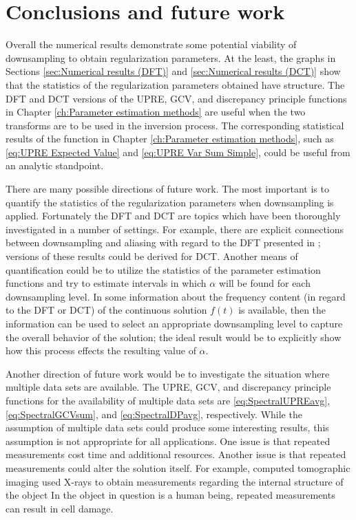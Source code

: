 \documentclass[12pt,notitlepage]{report}
\newcommand{\regparam}{\alpha}
\begin{document}
\chapter{Conclusions and future work} \label{ch:Conclusion}
Overall the numerical results demonstrate some potential viability of downsampling to obtain regularization parameters. At the least, the graphs in Sections \ref{sec:Numerical results (DFT)} and \ref{sec:Numerical results (DCT)} show that the statistics of the regularization parameters obtained have structure. The DFT and DCT versions of the UPRE, GCV, and discrepancy principle functions in Chapter \ref{ch:Parameter estimation methods} are useful when the two transforms are to be used in the inversion process. The corresponding statistical results of the function in Chapter \ref{ch:Parameter estimation methods}, such as \eqref{eq:UPRE Expected Value} and \eqref{eq:UPRE Var Sum Simple}, could be useful from an analytic standpoint. \par 
There are many possible directions of future work. The most important is to quantify the statistics of the regularization parameters when downsampling is applied. Fortunately the DFT and DCT are topics which have been thoroughly investigated in a number of settings. For example, there are explicit connections between downsampling and aliasing with regard to the DFT presented in \cite[Ch.~7]{AudioDFT}; versions of these results could be derived for DCT.  Another means of quantification could be to utilize the statistics of the parameter estimation functions and try to estimate intervals in which $\regparam$ will be found for each downsampling level. In some information about the frequency content (in regard to the DFT or DCT) of the continuous solution $f(t)$ is available, then the information can be used to select an appropriate downsampling level to capture the overall behavior of the solution; the ideal result would be to explicitly show how this process effects the resulting value of $\regparam$. \par 
Another direction of future work would be to investigate the situation where multiple data sets are available. The UPRE, GCV, and discrepancy principle functions for the availability of multiple data sets are \eqref{eq:SpectralUPREavg}, \eqref{eq:SpectralGCVsum}, and \eqref{eq:SpectralDPavg}, respectively. While the assumption of multiple data sets could produce some interesting results, this assumption is not appropriate for all applications. One issue is that repeated measurements cost time and additional resources. Another issue is that repeated measurements could alter the solution itself. For example, computed tomographic imaging used X-rays to obtain measurements regarding the internal structure of the object \cite[p.~12-14]{ABT} In the object in question is a human being, repeated measurements can result in cell damage. \par 
\end{document}
